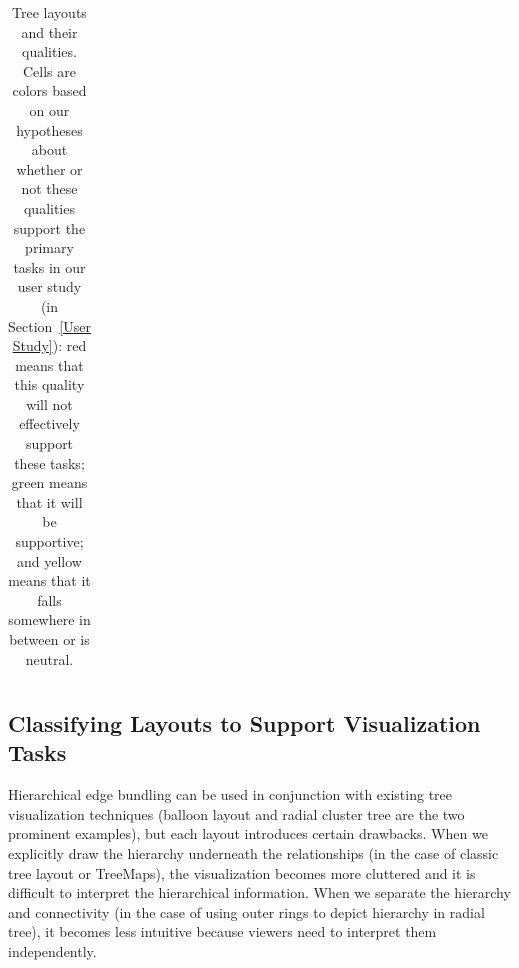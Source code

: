 \documentclass[a4paper]{llncs}
\begin{document}
\begin{table}[htb]
\begin{center}
\begin{tabular}{ l c c c c c c }
    \\ \bottomrule
      \end{tabular}
            
      \caption{Tree layouts and their qualities. Cells are colors based on our hypotheses about whether or not these qualities support the primary tasks in our user study (in Section~\ref{User Study}): red means that this quality will not effectively support these tasks; green means that it will be supportive; and yellow means that it falls somewhere in between or is neutral. %
      }
      \label{table: tree qualities}
      \end{center}
\end{table}


\subsection{Classifying Layouts to Support Visualization Tasks}
\label{classifyLayouts}

Hierarchical edge bundling can be used in conjunction with existing tree visualization techniques (balloon layout and radial cluster tree are the two prominent examples), but each layout introduces certain drawbacks. When we explicitly draw the hierarchy underneath the relationships (in the case of classic tree layout or TreeMaps), the visualization becomes more cluttered and it is difficult to interpret the hierarchical information. When we separate the hierarchy and connectivity (in the case of using outer rings to depict hierarchy in radial tree), it becomes less intuitive because viewers need to interpret them independently.




\end{document}
